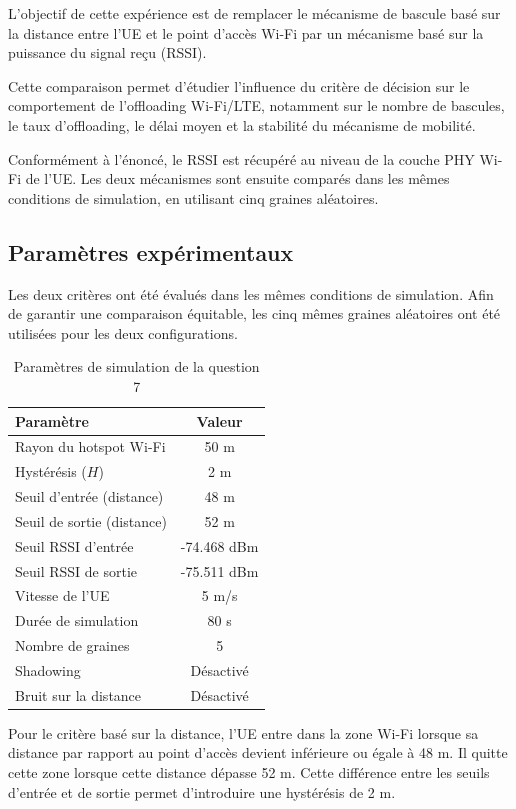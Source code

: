 L'objectif de cette expérience est de remplacer le mécanisme de
bascule basé sur la distance entre l'UE et le point d'accès Wi-Fi
par un mécanisme basé sur la puissance du signal reçu (RSSI).

Cette comparaison permet d'étudier l'influence du critère de
décision sur le comportement de l'offloading Wi-Fi/LTE, notamment
sur le nombre de bascules, le taux d'offloading, le délai moyen
et la stabilité du mécanisme de mobilité.

Conformément à l'énoncé, le RSSI est récupéré au niveau de la
couche PHY Wi-Fi de l'UE. Les deux mécanismes sont ensuite
comparés dans les mêmes conditions de simulation, en utilisant
cinq graines aléatoires.

\subsection{Paramètres expérimentaux}

Les deux critères ont été évalués dans les mêmes conditions
de simulation. Afin de garantir une comparaison équitable,
les cinq mêmes graines aléatoires ont été utilisées pour les
deux configurations.

\begin{table}[H]
\centering
\caption{Paramètres de simulation de la question 7}
\label{tab:q7_parameters}
\begin{tabular}{|l|c|}
\hline
\textbf{Paramètre} & \textbf{Valeur} \\
\hline
Rayon du hotspot Wi-Fi & 50 m \\
Hystérésis ($H$) & 2 m \\
Seuil d'entrée (distance) & 48 m \\
Seuil de sortie (distance) & 52 m \\
Seuil RSSI d'entrée & -74.468 dBm \\
Seuil RSSI de sortie & -75.511 dBm \\
Vitesse de l'UE & 5 m/s \\
Durée de simulation & 80 s \\
Nombre de graines & 5 \\
Shadowing & Désactivé \\
Bruit sur la distance & Désactivé \\
\hline
\end{tabular}
\end{table}

Pour le critère basé sur la distance, l'UE entre dans la zone
Wi-Fi lorsque sa distance par rapport au point d'accès devient
inférieure ou égale à 48 m. Il quitte cette zone lorsque cette
distance dépasse 52 m. Cette différence entre les seuils
d'entrée et de sortie permet d'introduire une hystérésis de
2 m.

